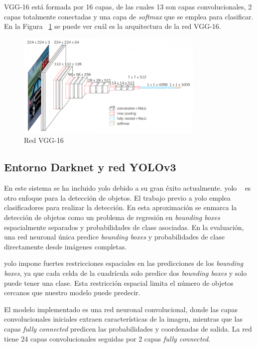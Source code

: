 VGG-16  está formada por 16 capas, de las cuales 13 son capas convolucionales, 2 capas totalmente conectadas y una capa de \textit{softmax} que se emplea para clasificar. En la Figura ~\ref{fig.vgg16} se puede ver cuál es la arquitectura de la red VGG-16.

 \begin{figure}[H] 
\begin{center}
	\includegraphics[width=0.8\textwidth]{figures/Diseno_global/vgg16.png}
   \caption{Red VGG-16}
	\label{fig.vgg16}
\end{center}
\end{figure}

\subsection{Entorno Darknet y red YOLOv3}\label{sub.darknet}

En este sistema se ha incluido \acrfull{yolo} debido a su gran éxito actualmente. \acrshort{yolo} ~\cite{yolo_article1} es otro enfoque para la detección de objetos. El trabajo previo a \acrshort{yolo} emplea clasificadores para realizar la detección. En esta aproximación se enmarca la detección de objetos como un problema de regresión en \textit{bounding boxes} espacialmente separados y probabilidades de clase asociadas. En la evaluación, una red neuronal única predice \textit{bounding boxes} y probabilidades de clase directamente desde imágenes completas. 

\acrshort{yolo} impone fuertes restricciones espaciales en las predicciones de los \textit{bounding boxes}, ya que cada celda de la cuadrícula solo predice dos \textit{bounding boxes} y solo puede tener una clase. Esta restricción espacial limita el número de objetos cercanos que nuestro modelo puede predecir. 

El modelo implementado es una red neuronal convolucional, donde las capas convolucionales iniciales extraen características de la imagen, mientras que las capas \textit{fully connected} predicen las probabilidades y coordenadas de salida. La red tiene 24 capas convolucionales seguidas por 2 capas \textit{fully connected}. 

